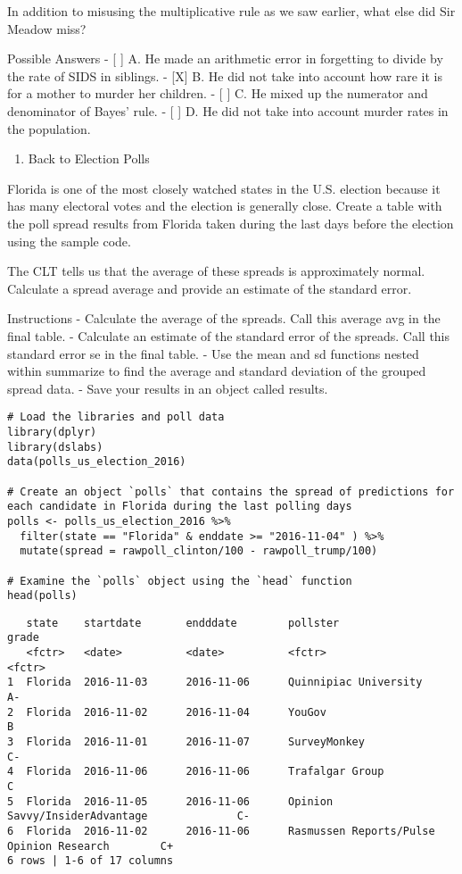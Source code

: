 \documentclass[
]{article}
\providecommand{\tightlist}{%
  \setlength{\itemsep}{0pt}\setlength{\parskip}{0pt}}
\begin{document}
In addition to misusing the multiplicative rule as we saw earlier, what
else did Sir Meadow miss?

Possible Answers - {[} {]} A. He made an arithmetic error in forgetting
to divide by the rate of SIDS in siblings. - {[}X{]} B. He did not take
into account how rare it is for a mother to murder her children. - {[}
{]} C. He mixed up the numerator and denominator of Bayes' rule. - {[}
{]} D. He did not take into account murder rates in the population.

\begin{enumerate}
\def\labelenumi{\arabic{enumi}.}
\setcounter{enumi}{5}
\tightlist
\item
  Back to Election Polls
\end{enumerate}

Florida is one of the most closely watched states in the U.S. election
because it has many electoral votes and the election is generally close.
Create a table with the poll spread results from Florida taken during
the last days before the election using the sample code.

The CLT tells us that the average of these spreads is approximately
normal. Calculate a spread average and provide an estimate of the
standard error.

Instructions - Calculate the average of the spreads. Call this average
avg in the final table. - Calculate an estimate of the standard error of
the spreads. Call this standard error se in the final table. - Use the
mean and sd functions nested within summarize to find the average and
standard deviation of the grouped spread data. - Save your results in an
object called results.

\begin{verbatim}
# Load the libraries and poll data
library(dplyr)
library(dslabs)
data(polls_us_election_2016)

# Create an object `polls` that contains the spread of predictions for each candidate in Florida during the last polling days
polls <- polls_us_election_2016 %>% 
  filter(state == "Florida" & enddate >= "2016-11-04" ) %>% 
  mutate(spread = rawpoll_clinton/100 - rawpoll_trump/100)

# Examine the `polls` object using the `head` function
head(polls)
\end{verbatim}

\begin{verbatim}
   state    startdate       endddate        pollster                                        grade
   <fctr>   <date>          <date>          <fctr>                                          <fctr>
1  Florida  2016-11-03      2016-11-06      Quinnipiac University                       A-  
2  Florida  2016-11-02      2016-11-04      YouGov                                      B   
3  Florida  2016-11-01      2016-11-07      SurveyMonkey                                C-  
4  Florida  2016-11-06      2016-11-06      Trafalgar Group                             C   
5  Florida  2016-11-05      2016-11-06      Opinion Savvy/InsiderAdvantage              C-  
6  Florida  2016-11-02      2016-11-06      Rasmussen Reports/Pulse Opinion Research        C+  
6 rows | 1-6 of 17 columns
\end{verbatim}
\end{document}
